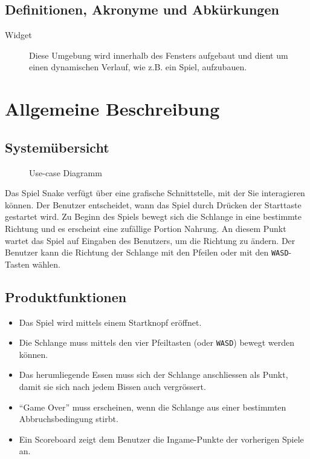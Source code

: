 \documentclass[a4paper, twosided, 11pt]{scrartcl}
\begin{document}
\subsection{Definitionen, Akronyme und Abk\"urkungen}

\begin{description}
  \item[Widget] Diese Umgebung wird innerhalb des Fensters aufgebaut und dient
    um einen dynamischen Verlauf, wie z.B. ein Spiel, aufzubauen.
\end{description}

\section{Allgemeine Beschreibung}
\subsection{System\"ubersicht}
\begin{figure}[h]
  \centering
  
  \caption{Use-case Diagramm}
\end{figure}

Das Spiel Snake verfügt über eine grafische Schnittstelle, mit der Sie
interagieren können.  Der Benutzer entscheidet, wann das Spiel durch Drücken
der Starttaste gestartet wird.  Zu Beginn des Spiels bewegt sich die Schlange
in eine bestimmte Richtung und es erscheint eine zufällige Portion Nahrung.  An
diesem Punkt wartet das Spiel auf Eingaben des Benutzers, um die Richtung zu
ändern. Der Benutzer kann die Richtung der Schlange mit den Pfeilen oder mit
den \texttt{WASD}-Tasten wählen. 

\subsection{Produktfunktionen} \label{sec:product-functions}
\begin{itemize}
  \item Das Spiel wird mittels einem Startknopf eröffnet.

  \item Die Schlange muss mittels den vier Pfeiltasten (oder \texttt{WASD})
    bewegt werden können.

  \item Das herumliegende Essen muss sich der Schlange anschliessen als Punkt,
    damit sie sich nach jedem Bissen auch vergrössert.

  \item ``Game Over'' muss erscheinen, wenn die Schlange aus einer bestimmten
    Abbruchsbedingung stirbt.

  \item Ein Scoreboard zeigt dem Benutzer die Ingame-Punkte der vorherigen Spiele an.
\end{itemize}
\end{document}
